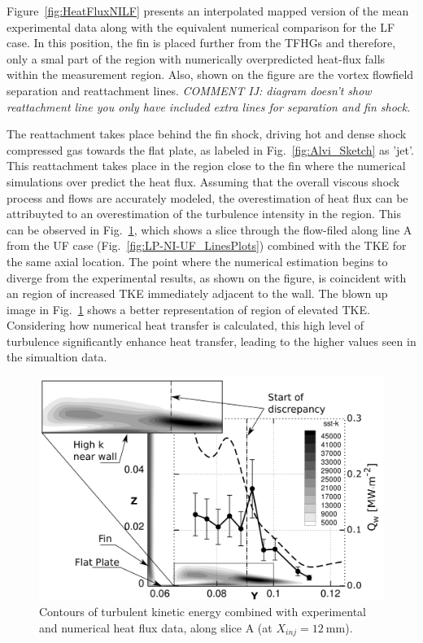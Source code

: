 \documentclass{AIAA}
\begin{document}
Figure~\ref{fig:HeatFluxNILF} presents an interpolated mapped version of the mean experimental data along with the equivalent numerical comparison for the LF case.
In this position, the fin is placed further from the TFHGs and therefore, only a smal part of the region with numerically overpredicted heat-flux falls within the measurement region.
Also, shown on the figure are the vortex flowfield separation and reattachment lines.
{\it COMMENT IJ: diagram doesn't show reattachment line you only have included extra lines for separation and fin shock.}

The reattachment takes place behind the fin shock, driving hot and dense shock compressed gas towards the flat plate, as labeled in Fig.~\ref{fig:Alvi_Sketch} as 'jet'.
This reattachment takes place in the region close to the fin where the numerical simulations over predict the heat flux.
Assuming that the overall viscous shock process and flows are accurately modeled, the overestimation of heat flux can be attribuyted to an overestimation of the turbulence intensity in the region.
This can be observed in Fig.~\ref{fig:SSTk_Q_Combi}, which shows a slice through the flow-filed along line A from the UF case (Fig.~\ref{fig:LP-NI-UF_LinesPlots}) combined with the TKE for the same axial location.
The point where the numerical estimation begins to diverge from the experimental results, as shown on the figure, is coincident with an region of increased TKE immediately adjacent to the wall.
The blown up image in Fig.~\ref{fig:SSTk_Q_Combi} shows a better representation of region of elevated TKE.
Considering how numerical heat transfer is calculated, this high level of turbulence significantly enhance heat transfer, leading to the higher values seen in the simualtion data.

%
\begin{figure}[!h]
\center
\includegraphics[width=0.70\columnwidth,valign=t]{Figures/SST-K_X137_LP_NI_UF_Q_and_SSTk_Combined.pdf}
\caption{Contours of turbulent kinetic energy combined with experimental and numerical heat flux data, along slice A (at $X_{inj} = \SI{12}{\milli\meter}$).}
\label{fig:SSTk_Q_Combi}
\end{figure} 
\end{document}
